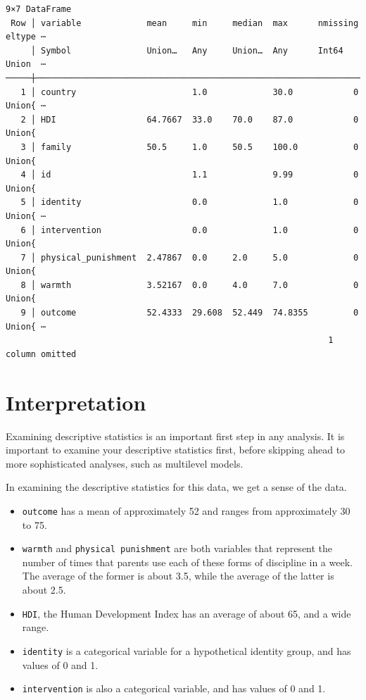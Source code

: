 \documentclass[
  letterpaper,
  DIV=11,
  numbers=noendperiod]{scrreprt}
\providecommand{\tightlist}{%
  \setlength{\itemsep}{0pt}\setlength{\parskip}{0pt}}\usepackage{longtable,booktabs,array}
\begin{document}
\begin{verbatim}
9×7 DataFrame
 Row │ variable             mean     min     median  max      nmissing  eltype ⋯
     │ Symbol               Union…   Any     Union…  Any      Int64     Union  ⋯
─────┼──────────────────────────────────────────────────────────────────────────
   1 │ country                       1.0             30.0            0  Union{ ⋯
   2 │ HDI                  64.7667  33.0    70.0    87.0            0  Union{
   3 │ family               50.5     1.0     50.5    100.0           0  Union{
   4 │ id                            1.1             9.99            0  Union{
   5 │ identity                      0.0             1.0             0  Union{ ⋯
   6 │ intervention                  0.0             1.0             0  Union{
   7 │ physical_punishment  2.47867  0.0     2.0     5.0             0  Union{
   8 │ warmth               3.52167  0.0     4.0     7.0             0  Union{
   9 │ outcome              52.4333  29.608  52.449  74.8355         0  Union{ ⋯
                                                                1 column omitted
\end{verbatim}

\section{Interpretation}\label{interpretation}

Examining descriptive statistics is an important first step in any
analysis. It is important to examine your descriptive statistics first,
before skipping ahead to more sophisticated analyses, such as multilevel
models.

In examining the descriptive statistics for this data, we get a sense of
the data.

\begin{itemize}
\tightlist
\item
  \texttt{outcome} has a mean of approximately 52 and ranges from
  approximately 30 to 75.
\item
  \texttt{warmth} and \texttt{physical\ punishment} are both variables
  that represent the number of times that parents use each of these
  forms of discipline in a week. The average of the former is about 3.5,
  while the average of the latter is about 2.5.
\item
  \texttt{HDI}, the Human Development Index has an average of about 65,
  and a wide range.
\item
  \texttt{identity} is a categorical variable for a hypothetical
  identity group, and has values of 0 and 1.
\item
  \texttt{intervention} is also a categorical variable, and has values
  of 0 and 1.
\end{itemize}
\end{document}
